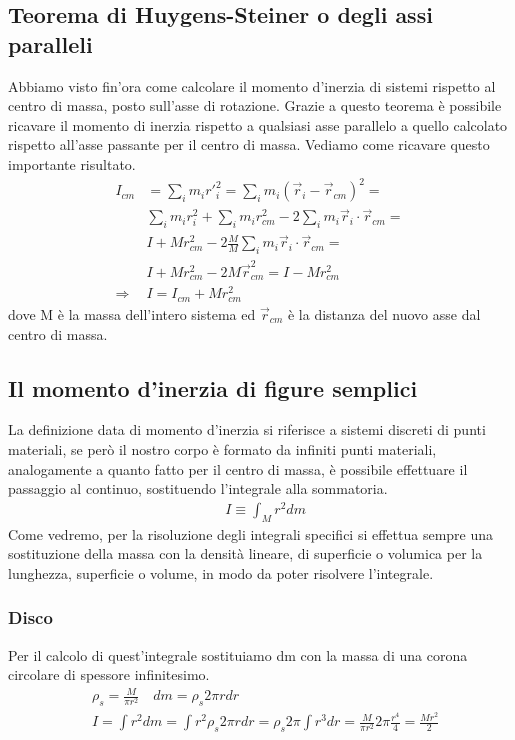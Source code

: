 \subsection{Teorema di Huygens-Steiner o degli assi paralleli}
Abbiamo visto fin'ora come calcolare il momento d'inerzia di sistemi rispetto al centro di massa, posto sull'asse di rotazione. Grazie a questo teorema è possibile ricavare il momento di inerzia rispetto a qualsiasi asse parallelo a quello calcolato rispetto all'asse passante per il centro di massa. Vediamo come ricavare questo importante risultato. 
\begin{align*}
	I_{cm} &= \sum_i m_i r'^2_i = \sum_i m_i (\vec{r}_i-\vec{r}_{cm})^2 =\\
	& \sum_i m_i r_i^2 + \sum_i m_i r_{cm}^2 -2\sum_i m_i \vec{r}_i\cdot \vec{r}_{cm} =\\
	&I + M r_{cm}^2 -2 \frac{M}{M} \sum_i m_i \vec{r}_i\cdot \vec{r}_{cm} =\\
	&I + M r_{cm}^2 -2 M \vec{r}_{cm}^2 = I - M r_{cm}^2\\
	\Rightarrow & I = I_{cm} +  M r_{cm}^2
\end{align*}
dove M è la massa dell'intero sistema ed $\vec{r}_{cm}$ è la distanza del nuovo asse dal centro di massa. 
\subsection{Il momento d'inerzia di figure semplici}
La definizione data di momento d'inerzia si riferisce a sistemi discreti di punti materiali, se però il nostro corpo è formato da infiniti punti materiali, analogamente a quanto fatto per il centro di massa, è possibile effettuare il passaggio al continuo, sostituendo l'integrale alla sommatoria. 
\begin{align*}
	&I \equiv \int_M r^2 dm
\end{align*}
Come vedremo, per la risoluzione degli integrali specifici si effettua sempre una sostituzione della massa con la densità lineare, di superficie o volumica per la lunghezza, superficie o volume, in modo da poter risolvere l'integrale.
\subsubsection*{Disco}
Per il calcolo di quest'integrale sostituiamo dm con la massa di una corona circolare di spessore infinitesimo.
\begin{align*}
	&\rho_s = \frac{M}{\pi r^2} \quad dm = \rho_s 2 \pi r dr \\
	&I = \int r^2 dm = \int r^2 \rho_s 2\pi r dr = \rho_s 2\pi \int r^3 dr = \frac{M}{\pi r^2} 2\pi \frac{r^4}{4} = \frac{M r^2}{2}  
\end{align*}
